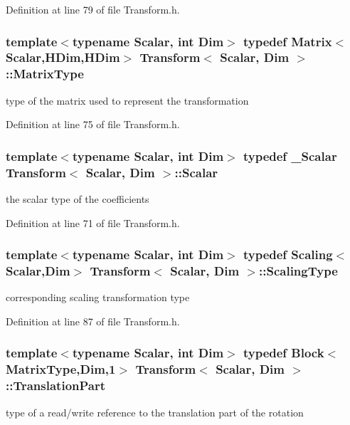 Definition at line 79 of file Transform.\-h.

\hypertarget{class_transform_afcdb9f1ab6b63ddfbc52789ef6319f33}{
\subsubsection[{Matrix\-Type}]{\setlength{\rightskip}{0pt plus 5cm}template$<$typename Scalar, int Dim$>$ typedef {\bf Matrix}$<${\bf Scalar},H\-Dim,H\-Dim$>$ {\bf Transform}$<$ {\bf Scalar}, Dim $>$\-::{\bf Matrix\-Type}}}\label{class_transform_afcdb9f1ab6b63ddfbc52789ef6319f33}
type of the matrix used to represent the transformation 

Definition at line 75 of file Transform.\-h.

\hypertarget{class_transform_a0468fefb805493a70f2100c7faf05489}{
\subsubsection[{Scalar}]{\setlength{\rightskip}{0pt plus 5cm}template$<$typename Scalar, int Dim$>$ typedef \-\_\-\-Scalar {\bf Transform}$<$ {\bf Scalar}, Dim $>$\-::{\bf Scalar}}}\label{class_transform_a0468fefb805493a70f2100c7faf05489}
the scalar type of the coefficients 

Definition at line 71 of file Transform.\-h.

\hypertarget{class_transform_a4b7ae3ae58b92b27215b3eed30fde503}{
\subsubsection[{Scaling\-Type}]{\setlength{\rightskip}{0pt plus 5cm}template$<$typename Scalar, int Dim$>$ typedef {\bf Scaling}$<${\bf Scalar},Dim$>$ {\bf Transform}$<$ {\bf Scalar}, Dim $>$\-::{\bf Scaling\-Type}}}\label{class_transform_a4b7ae3ae58b92b27215b3eed30fde503}
corresponding scaling transformation type 

Definition at line 87 of file Transform.\-h.

\hypertarget{class_transform_a00ccb56dcd1ca99fb61b87fa229f0440}{
\subsubsection[{Translation\-Part}]{\setlength{\rightskip}{0pt plus 5cm}template$<$typename Scalar, int Dim$>$ typedef {\bf Block}$<${\bf Matrix\-Type},Dim,1$>$ {\bf Transform}$<$ {\bf Scalar}, Dim $>$\-::{\bf Translation\-Part}}}\label{class_transform_a00ccb56dcd1ca99fb61b87fa229f0440}
type of a read/write reference to the translation part of the rotation 

